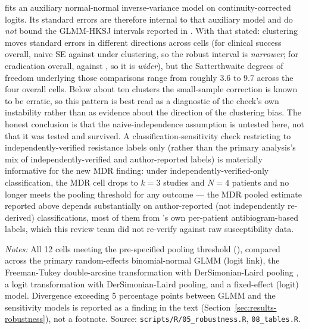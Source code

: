 fits an auxiliary normal-normal inverse-variance model on continuity-corrected logits. Its standard errors are therefore internal to that auxiliary model and do \emph{not} bound the GLMM-HKSJ intervals reported in . With that stated: clustering moves standard errors in different directions across cells (for clinical success overall, naive SE \RveCsNaive against \RveCsRobust under clustering, so the robust interval is \emph{narrower}; for eradication overall, \RveEradNaive against \RveEradRobust , so it is \emph{wider}), but the Satterthwaite degrees of freedom underlying those comparisons range from roughly 3.6 to 9.7 across the four overall cells. Below about ten clusters the small-sample correction is known to be erratic, so this pattern is best read as a diagnostic of the check's own instability rather than as evidence about the direction of the clustering bias. The honest conclusion is that the naive-independence assumption is untested here, not that it was tested and survived. A classification-sensitivity check restricting to independently-verified resistance labels only (rather than the primary analysis's mix of independently-verified and author-reported labels) is materially informative for the new MDR finding: under independently-verified-only classification, the MDR cell drops to $k=3$ studies and $N=4$ patients and no longer meets the pooling threshold for any outcome --- the MDR pooled estimate reported above depends substantially on author-reported (not independently re-derived) classifications, most of them from \citeauthor{Pirnay2024_natmicrobiol}'s own per-patient antibiogram-based labels, which this review team did not re-verify against raw susceptibility data.

\begin{table}[htbp]
\centering
\scriptsize
\setlength{\tabcolsep}{3pt}
\begin{threeparttable}
\caption{Sensitivity of pooled estimates to transformation and pooling-model choice}
\label{tab:sensitivity}

\begin{tablenotes}
\small
\item \textit{Notes:} All 12 cells meeting the pre-specified pooling threshold (), compared across the primary random-effects binomial-normal GLMM (logit link), the Freeman-Tukey double-arcsine transformation with DerSimonian-Laird pooling \parencite{FreemanTukey1950,DerSimonianLaird1986}, a logit transformation with DerSimonian-Laird pooling, and a fixed-effect (logit) model. Divergence exceeding 5 percentage points between GLMM and the sensitivity models is reported as a finding in the text (Section~\ref{sec:results-robustness}), not a footnote. Source: \texttt{scripts/R/05\_robustness.R}, \texttt{08\_tables.R}.
\end{tablenotes}
\end{threeparttable}
\end{table}

